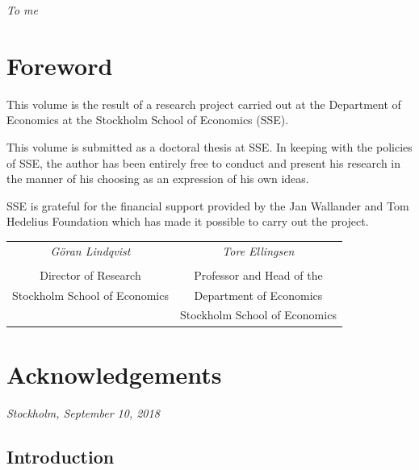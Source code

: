 \documentclass[twoside,11pt,american,openright,final]{memoir}
\begin{document}
\cleardoublepage
\thispagestyle{empty}
\vspace*{45mm}
\begin{center}
\textit{To me}
\end{center}

\cleardoublepage
\chapter*{Foreword}\thispagestyle{empty}
This volume is the result of a research project carried out at the Department of Economics at the Stockholm School of Economics (SSE).

This volume is submitted as a doctoral thesis at SSE. In keeping with the policies of SSE, the author has been entirely free to conduct and present his research in the manner of his choosing as an expression of his own ideas.

SSE is grateful for the financial support provided by the Jan Wallander and Tom Hedelius Foundation which has made it possible to carry out the project.

\vspace{2\onelineskip}

\begin{tabular}{cc}
\emph{Göran Lindqvist} & \emph{Tore Ellingsen}\\
& \\
Director of Research & Professor and Head of the\\
Stockholm School of Economics & Department of Economics\\
& Stockholm School of Economics
\end{tabular}
\cleardoublepage

\chapter*{Acknowledgements}\thispagestyle{empty}
\par\bigskip
\begin{center}
\emph{Stockholm, September 10, 2018}\par\smallskip
\emph{\theauthor}
\end{center}
\cleardoublepage

\tableofcontents* %
\cleardoublepage
\mainmatter %

\begin{refsection}
\chapter*{Introduction}

\clearpage
\nobibintoc{}\bibintoc
\end{refsection}
\end{document}
